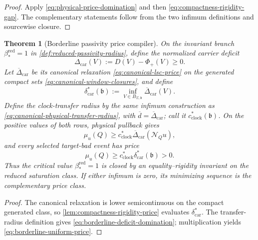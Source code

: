 \documentclass[11pt]{article}
\numberwithin{section}{part}
\theoremstyle{plain}
\newtheorem{theorem}{Theorem}[section]
\theoremstyle{definition}
\theoremstyle{remark}
\begin{document}
\begin{proof}
Apply \eqref{eq:physical-price-domination} and then
\eqref{eq:compactness-rigidity-gap}.  The complementary statements follow
from the two infimum definitions and sourcewise closure.
\end{proof}

\begin{theorem}[Borderline passivity price compiler]
\label{thm:borderline-passivity-price}
On the invariant branch \(\beta_*^{\mathrm{red}}=1\) in
\cref{def:reduced-passivity-radius}, define the normalized carrier deficit
\begin{equation}
 \label{eq:normalized-carrier-deficit}
 \Delta_{\mathrm{car}}(V):=D(V)-\Phi_+(V)\ge0.
\end{equation}
Let \(\overline\Delta_{\mathrm{car}}\) be its canonical relaxation
\eqref{eq:canonical-lsc-price} on the generated compact sets
\eqref{eq:canonical-window-closures}, and define
\begin{equation}
 \label{eq:borderline-equality-rigidity}
 \delta_{\mathrm{car}}^*(\mathfrak b)
 :=\inf_{V\in B_{\Sigma,\mathfrak b}}\overline\Delta_{\mathrm{car}}(V).
\end{equation}
Define the clock-transfer radius by the same infimum construction as
\eqref{eq:canonical-physical-transfer-radius}, with
\(\overline d=\overline\Delta_{\mathrm{car}}\); call it
\(c_{\mathrm{clock}}^*(\mathfrak b)\).  On the positive values of both rows,
physical pullback gives
\begin{equation}
 \label{eq:borderline-deficit-domination}
 \mu_u(Q)\ge c_{\mathrm{clock}}^*
 \overline\Delta_{\mathrm{car}}(\mathcal N_Qu),
\end{equation}
and every selected target-bad event has price
\begin{equation}
 \label{eq:borderline-uniform-price}
 \mu_u(Q)\ge
 c_{\mathrm{clock}}^*\delta_{\mathrm{car}}^*(\mathfrak b)>0.
\end{equation}
Thus the critical value \(\beta_*^{\mathrm{red}}=1\) is closed by an
equality--rigidity invariant on the reduced saturation class.  If either
infimum is zero, its minimizing sequence is the complementary price class.
\end{theorem}

\begin{proof}
The canonical relaxation is lower semicontinuous on the compact generated
class, so \cref{lem:compactness-rigidity-price} evaluates
\(\delta_{\mathrm{car}}^*\).  The transfer-radius definition gives
\eqref{eq:borderline-deficit-domination}; multiplication yields
\eqref{eq:borderline-uniform-price}.
\end{proof}
\end{document}
